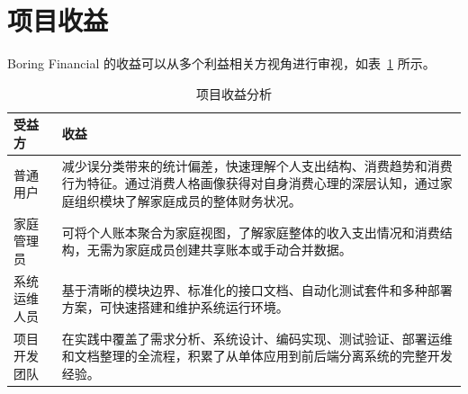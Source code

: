 \section{项目收益}

Boring Financial 的收益可以从多个利益相关方视角进行审视，如表~\ref{tab:benefits} 所示。

\begin{table}[H]
\centering
\caption{项目收益分析}
\label{tab:benefits}
\begin{tabular}{p{2.8cm}p{10.4cm}}
\toprule
\textbf{受益方} & \textbf{收益} \\
\midrule
普通用户 & 减少误分类带来的统计偏差，快速理解个人支出结构、消费趋势和消费行为特征。通过消费人格画像获得对自身消费心理的深层认知，通过家庭组织模块了解家庭成员的整体财务状况。 \\
\addlinespace
家庭管理员 & 可将个人账本聚合为家庭视图，了解家庭整体的收入支出情况和消费结构，无需为家庭成员创建共享账本或手动合并数据。 \\
\addlinespace
系统运维人员 & 基于清晰的模块边界、标准化的接口文档、自动化测试套件和多种部署方案，可快速搭建和维护系统运行环境。 \\
\addlinespace
项目开发团队 & 在实践中覆盖了需求分析、系统设计、编码实现、测试验证、部署运维和文档整理的全流程，积累了从单体应用到前后端分离系统的完整开发经验。 \\
\bottomrule
\end{tabular}
\end{table}
